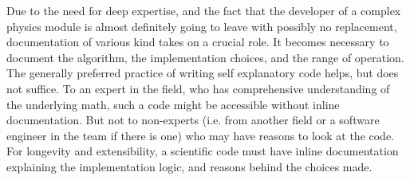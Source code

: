 Due to the need for deep expertise, and the fact that the developer of a
complex physics module is almost definitely going to leave with
possibly no replacement, documentation of various kind takes on a
crucial role. It becomes necessary to document the algorithm, the
implementation choices, and the range of operation. The generally
preferred practice of writing self explanatory code helps, but does
not suffice. To an expert in the field, who has comprehensive
understanding of the underlying math, such a code might be accessible
without inline documentation. But not to non-experts (i.e. from
another field or a software engineer in the team if there is one) who
may have reasons to look at the code. For longevity and
extensibility, a scientific code must have inline documentation
explaining the implementation logic, and reasons behind the
choices made.   
